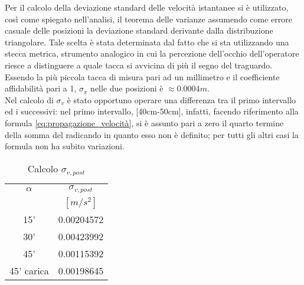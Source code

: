 \documentclass[a4paper,11pt,oneside]{article}
\begin{document}
Per il calcolo della deviazione standard delle velocità istantanee si è utilizzato, così come spiegato nell'analisi, il teorema delle varianze assumendo come errore casuale delle posizioni la deviazione standard derivante dalla distribuzione triangolare. Tale scelta è stata determinata dal fatto che si sta utilizzando una stecca metrica, strumento analogico in cui la percezione dell'occhio dell'operatore riesce a distinguere a quale tacca si avvicina di più il segno del traguardo. Essendo la più piccola tacca di misura pari ad un millimetro e il coefficiente affidabilità pari a 1, $\sigma_x$ nelle due posizioni è $\approx0.0004\si{m}$.\\
Nel calcolo di $\sigma_v$ è stato opportuno operare una differenza tra il primo intervallo ed i successivi: nel primo intervallo, [40cm-50cm], infatti, facendo riferimento alla formula \ref{eq:propagazione_velocità}, si è assunto pari a zero il quarto termine della somma del radicando in quanto esso non è definito; per tutti gli altri casi la formula non ha subito variazioni.

\begin{wraptable}{l}{5cm}
    \begin{tabular}{c|c}
        \toprule
        $\alpha$ & $\sigma_{v, post}$ \\
        & $[\si{m/s^{2}}]$\\
        \midrule
        15' &  0.00204572\\
        30' & 0.00423992 \\
        45' & 0.00115392 \\
        45' carica & 0.00198645 \\
        \bottomrule
    \end{tabular}
    \caption{Calcolo $\sigma_{v, post}$}
    \label{tab:v_post}
\end{wraptable}
\end{document}

